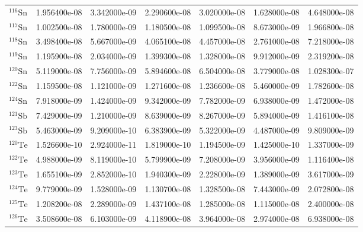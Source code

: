 \begin{tabular}{lrrrrrr}
$^{116}\mathrm{Sn}$ &       1.956400e-08 &      3.342000e-09 &      2.290600e-08 &       3.020000e-08 &      1.628000e-08 &      4.648000e-08 \\
$^{117}\mathrm{Sn}$ &       1.002500e-08 &      1.780000e-09 &      1.180500e-08 &       1.099500e-08 &      8.673000e-09 &      1.966800e-08 \\
$^{118}\mathrm{Sn}$ &       3.498400e-08 &      5.667000e-09 &      4.065100e-08 &       4.457000e-08 &      2.761000e-08 &      7.218000e-08 \\
$^{119}\mathrm{Sn}$ &       1.195900e-08 &      2.034000e-09 &      1.399300e-08 &       1.328000e-08 &      9.912000e-09 &      2.319200e-08 \\
$^{120}\mathrm{Sn}$ &       5.119000e-08 &      7.756000e-09 &      5.894600e-08 &       6.504000e-08 &      3.779000e-08 &      1.028300e-07 \\
$^{122}\mathrm{Sn}$ &       1.159500e-08 &      1.121000e-09 &      1.271600e-08 &       1.236600e-08 &      5.460000e-09 &      1.782600e-08 \\
$^{124}\mathrm{Sn}$ &       7.918000e-09 &      1.424000e-09 &      9.342000e-09 &       7.782000e-09 &      6.938000e-09 &      1.472000e-08 \\
$^{121}\mathrm{Sb}$ &       7.429000e-09 &      1.210000e-09 &      8.639000e-09 &       8.267000e-09 &      5.894000e-09 &      1.416100e-08 \\
$^{123}\mathrm{Sb}$ &       5.463000e-09 &      9.209000e-10 &      6.383900e-09 &       5.322000e-09 &      4.487000e-09 &      9.809000e-09 \\
$^{120}\mathrm{Te}$ &       1.526600e-10 &      2.924000e-11 &      1.819000e-10 &       1.194500e-09 &      1.425000e-10 &      1.337000e-09 \\
$^{122}\mathrm{Te}$ &       4.988000e-09 &      8.119000e-10 &      5.799900e-09 &       7.208000e-09 &      3.956000e-09 &      1.116400e-08 \\
$^{123}\mathrm{Te}$ &       1.655100e-09 &      2.852000e-10 &      1.940300e-09 &       2.228000e-09 &      1.389000e-09 &      3.617000e-09 \\
$^{124}\mathrm{Te}$ &       9.779000e-09 &      1.528000e-09 &      1.130700e-08 &       1.328500e-08 &      7.443000e-09 &      2.072800e-08 \\
$^{125}\mathrm{Te}$ &       1.208200e-08 &      2.289000e-09 &      1.437100e-08 &       1.285000e-08 &      1.115000e-08 &      2.400000e-08 \\
$^{126}\mathrm{Te}$ &       3.508600e-08 &      6.103000e-09 &      4.118900e-08 &       3.964000e-08 &      2.974000e-08 &      6.938000e-08 \\

\end{tabular}
